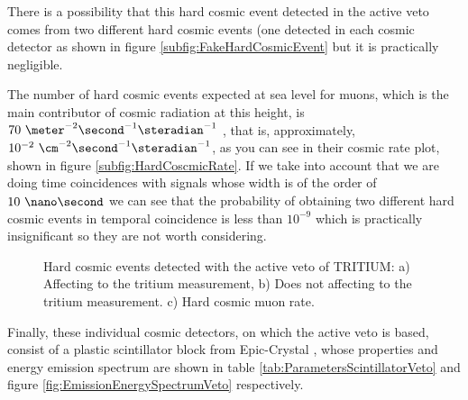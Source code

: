 There is a possibility that this hard cosmic event detected in the active veto comes from two different hard cosmic events (one detected in each cosmic detector as shown in figure \ref{subfig:FakeHardCosmicEvent} but it is practically negligible.

The number of hard cosmic events expected at sea level for muons, which is the main contributor of cosmic radiation at this height, is $70~\meter^{-2}\second^{-1}\steradian^{-1}$ \cite{PDG}\cite{HardCosmicMuonRate}, that is, approximately, $10^{-2}~\cm^{-2}\second^{-1}\steradian^{-1}$, as you can see in their cosmic rate plot, shown in figure \ref{subfig:HardCoscmicRate}. If we take into account that we are doing time coincidences with signals whose width is of the order of $10~\nano\second$ we can see that the probability of obtaining two different hard cosmic events in temporal coincidence is less than $10^{-9}$ which is practically insignificant so they are not worth considering.

\begin{figure}[h]
 \centering
 \caption{Hard cosmic events detected with the active veto of TRITIUM: a) Affecting to the tritium measurement, b) Does not affecting to the tritium measurement. c) Hard cosmic muon rate. }
 \label{fig:HardCosmicEventsSimulation}
\end{figure}

Finally, these individual cosmic detectors, on which the active veto is based, consist of a plastic scintillator block from Epic-Crystal \cite{ScintillatorVeto}, whose properties and energy emission spectrum are shown in table \ref{tab:ParametersScintillatorVeto} and figure \ref{fig:EmissionEnergySpectrumVeto} respectively.

